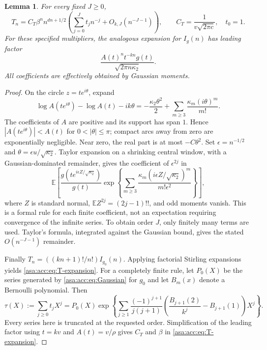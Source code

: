 \documentclass[11pt,letterpaper]{article}
\newtheorem{lemma}[theorem]{Lemma}
\theoremstyle{remark}\newtheorem{remark}[theorem]{Remark}
\numberwithin{equation}{section}
\newcommand{\E}{\mathbb E}\newcommand{\Prob}{\mathbb P}\newcommand{\Prb}{\mathbb P}
\begin{document}
\begin{lemma}\label{asa:acc:lem:saddle}
For every fixed $J\ge0$,
\begin{equation}\label{asa:acc:eq:T-expansion}
T_n=C_T\beta^n n^{dn+1/2}
\left(\sum_{j=0}^{J}t_jn^{-j}+O_{k,J}(n^{-J-1})\right),
\qquad C_T=\frac1{v\sqrt{2\pi c}},\quad t_0=1.
\end{equation}
For these specified multipliers, the analogous expansion for $I_g(n)$ has leading factor
\[
\frac{A(t)^nt^{-kn}g(t)}{\sqrt{2\pi n\kappa_2}}.
\]
All coefficients are effectively obtained by Gaussian moments.
\end{lemma}
\begin{proof}
On the circle $z=te^{i\theta}$, expand
\[
\log A(te^{i\theta})-\log A(t)-ik\theta
=-\frac{\kappa_2\theta^2}{2}+\sum_{m\ge3}\frac{\kappa_m(i\theta)^m}{m!}.
\]
The coefficients of $A$ are positive and its support has span $1$. Hence $|A(te^{i\theta})|<A(t)$ for $0<|\theta|\le\pi$; compact arcs away from zero are exponentially negligible. Near zero, the real part is at most $-C\theta^2$. Set $\epsilon=n^{-1/2}$ and $\theta=\epsilon u/\sqrt{\kappa_2}$. Taylor expansion on a shrinking central window, with a Gaussian-dominated remainder, gives the coefficient of $\epsilon^{2j}$ in
\begin{equation}\label{asa:acc:eq:Gaussian}
\E\left[
\frac{g(te^{i\epsilon Z/\sqrt{\kappa_2}})}{g(t)}
\exp\left\{\sum_{m\ge3}
\frac{\kappa_m(i\epsilon Z/\sqrt{\kappa_2})^m}{m!\epsilon^2}\right\}\right],
\end{equation}
where $Z$ is standard normal, $\E Z^{2j}=(2j-1)!!$, and odd moments vanish. This is a formal rule for each finite coefficient, not an expectation requiring convergence of the infinite series. To obtain order $J$, only finitely many terms are used. Taylor's formula, integrated against the Gaussian bound, gives the stated $O(n^{-J-1})$ remainder.

Finally $T_n=((kn+1)!/n!)I_{g_0}(n)$. Applying factorial Stirling expansions yields \eqref{asa:acc:eq:T-expansion}. For a completely finite rule, let $P_0(X)$ be the series generated by \eqref{asa:acc:eq:Gaussian} for $g_0$ and let $B_m(x)$ denote a Bernoulli polynomial. Then
\begin{equation}\label{asa:acc:eq:tau-algorithm}
\tau(X):=\sum_{j\ge0}t_jX^j
=P_0(X)\exp\left\{\sum_{j\ge1}\frac{(-1)^{j+1}}{j(j+1)}
\left(\frac{B_{j+1}(2)}{k^j}-B_{j+1}(1)\right)X^j\right\}.
\end{equation}
Every series here is truncated at the requested order. Simplification of the leading factor using $t=kv$ and $A(t)=v/\rho$ gives $C_T$ and $\beta$ in \eqref{asa:acc:eq:T-expansion}.
\end{proof}
\end{document}
